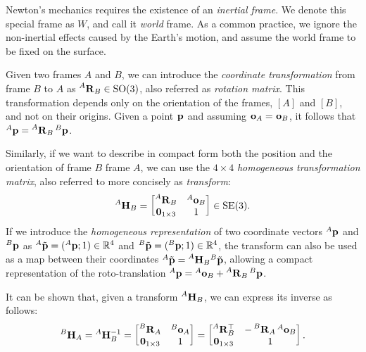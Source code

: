 \begin{definition*}
%
Newton's mechanics requires the existence of an \emph{inertial frame}.
We denote this special frame as $W$, and call it \emph{world} frame.
As a common practice, we ignore the non-inertial effects caused by the Earth's motion, and assume the world frame to be fixed on the surface.
%
\end{definition*}

Given two frames $A$ and $B$, we can introduce the \emph{coordinate transformation} from frame $B$ to $A$ as $\rot[A]_B \in \SO(3)$, also referred as \emph{rotation matrix}.
This transformation depends only on the orientation of the frames, $[A]$ and $[B]$, and not on their origins.
Given a point $\pos$ and assuming $\ori_A = \ori_B$, it follows that $\pos[A] = \rot[A]_B \pos[B]$.

Similarly, if we want to describe in compact form both the position and the orientation of frame $B$ \wrt frame $A$, we can use the $4 \times 4$ \emph{homogeneous transformation matrix}, also referred to more concisely as \emph{transform}:
%
\begin{equation*}
    \homo[A]_B = \begin{bmatrix} \rot[A]_B & \ori[A]_B \\ \zeros_{1 \times 3} & 1 \end{bmatrix} \in \SE(3)
    .
\end{equation*}
%
If we introduce the \emph{homogeneous representation} of two coordinate vectors $\pos[A]$ and $\pos[B]$ as ${}^A\Tilde{\mathbf{p}} = (\pos[A]; 1) \in \realn^4$ and ${}^B\Tilde{\mathbf{p}} = (\pos[B]; 1) \in \realn^4$, the transform can also be used as a map between their coordinates ${}^A\Tilde{\mathbf{p}} = \homo[A]_B {}^B\Tilde{\mathbf{p}}$, allowing a compact representation of the roto-translation $\pos[A] = \ori[A]_B + \rot[A]_B \pos[B]$.

It can be shown that, given a transform $\homo[A]_B$, we can express its inverse as follows:
%
\begin{equation}
    \label{eq:transform_inverse}
    \homo[B]_A = \homo[A]_B^{-1} =
    \begin{bmatrix}
        \rot[B]_A & \ori[B]_A \\
        \zeros_{1\times3} & 1
    \end{bmatrix} =
    \begin{bmatrix}
        \rot[A]_B^\top & -\rot[B]_A \ori[A]_B \\
        \zeros_{1\times3} & 1
    \end{bmatrix}
    .
\end{equation}

